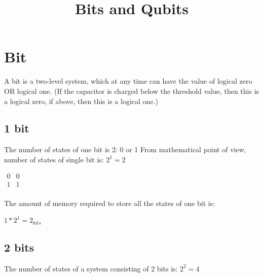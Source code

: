 \documentclass{article}
\title{\textbf{\huge Bits and Qubits}}
\date{}
\begin{document}
\pagestyle{headings}	
\newpage
\setcounter{page}{1}
\renewcommand{\thepage}{\arabic{page}}


	
	
\setlength{\parskip}{0.5em}
	
\maketitle
	



\section{Bit}


A bit is a two-level system, which at any time can have the value of logical zero OR logical one.
(If the capacitor is charged below the threshold value, then this is a logical zero, if above, then this is a logical one.)

\subsection{1 bit}

The number of states of one bit is 2: 0 or 1
From mathematical point of view, number of states of single bit is: $2^1=2$

$
\begin{array}{c|c}
0 & 0 \\
1 & 1 \\
\end{array}
$

The amount of memory required to store all the states of one bit is:

$1 * 2^1 = 2_{bits}$

\subsection{2 bits}


The number of states of a system consisting of 2 bits is: $2^2=4$

\end{document}
